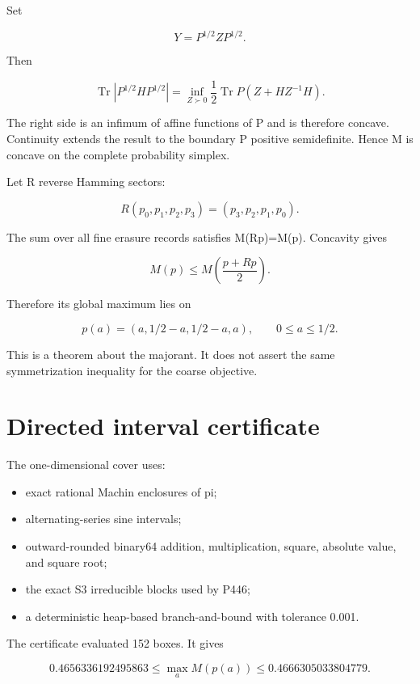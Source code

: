 \documentclass[11pt,a4paper,openany]{report}
\begin{document}
Set

\[
Y=P^{1/2}ZP^{1/2}.
\]

Then

\[
\operatorname{Tr}|P^{1/2}HP^{1/2}|
=\inf_{Z\succ0}
\frac12\operatorname{Tr}
P\left(Z+HZ^{-1}H\right).
\]

The right side is an infimum of affine functions of P and is therefore concave. Continuity extends the result to the boundary P positive semidefinite. Hence M is concave on the complete probability simplex.

Let R reverse Hamming sectors:

\[
R(p_0,p_1,p_2,p_3)=(p_3,p_2,p_1,p_0).
\]

The sum over all fine erasure records satisfies M(Rp)=M(p). Concavity gives

\[
M(p)
\le M\left(\frac{p+Rp}{2}\right).
\]

Therefore its global maximum lies on

\[
p(a)=(a,1/2-a,1/2-a,a),
\qquad0\le a\le1/2.
\]

This is a theorem about the majorant. It does not assert the same symmetrization inequality for the coarse objective.

\section{Directed interval certificate}

The one-dimensional cover uses:

\begin{itemize}
\item 
exact rational Machin enclosures of pi;

\item 
alternating-series sine intervals;

\item 
outward-rounded binary64 addition, multiplication, square, absolute value, and square root;

\item 
the exact S3 irreducible blocks used by P446;

\item 
a deterministic heap-based branch-and-bound with tolerance 0.001.

\end{itemize}

The certificate evaluated 152 boxes. It gives

\[
0.4656336192495863
\le\max_a M(p(a))
\le0.4666305033804779.
\]
\end{document}
